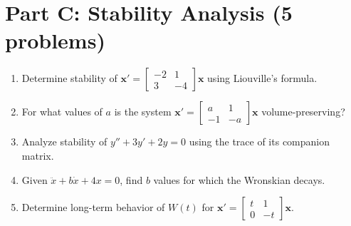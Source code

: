 \documentclass[12pt]{article}
\begin{document}

\section*{Part C: Stability Analysis (5 problems)}

\begin{enumerate}[resume]
\item Determine stability of $\mathbf{x}' = \begin{bmatrix} -2 & 1 \\ 3 & -4 \end{bmatrix}\mathbf{x}$ using Liouville's formula.

\item For what values of $a$ is the system $\mathbf{x}' = \begin{bmatrix} a & 1 \\ -1 & -a \end{bmatrix}\mathbf{x}$ volume-preserving?

\item Analyze stability of $y'' + 3y' + 2y = 0$ using the trace of its companion matrix.

\item Given $\ddot{x} + b\dot{x} + 4x = 0$, find $b$ values for which the Wronskian decays.

\item Determine long-term behavior of $W(t)$ for $\mathbf{x}' = \begin{bmatrix} t & 1 \\ 0 & -t \end{bmatrix}\mathbf{x}$.
\end{enumerate}
\end{document}
